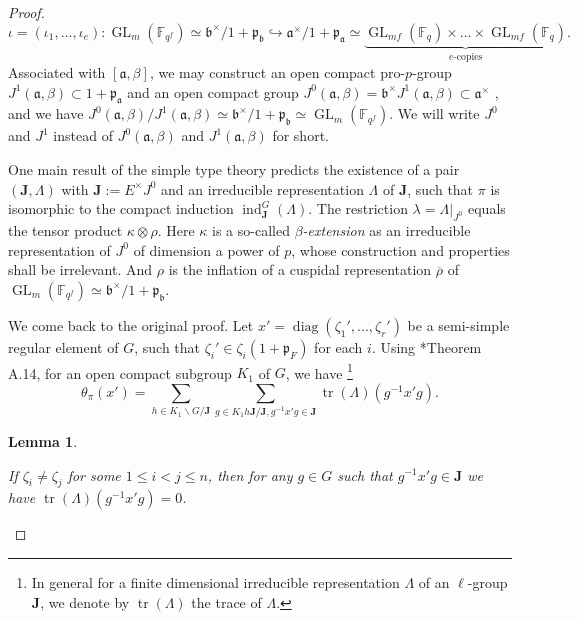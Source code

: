 \documentclass{amsart}
\numberwithin{equation}{section}
\newtheorem{lemma}[theorem]{\bf{Lemma}}
\newcommand{\rest}{\lvert}
\newcommand{\mrgl}{\operatorname{GL}}
\newcommand{\mrtr}{\operatorname{tr}}
\newcommand{\mrdiag}{\operatorname{diag}}
\newcommand{\mrind}{\operatorname{ind}}
\newcommand{\mbf}{\mathbb{F}}
\newcommand{\mfp}{\mathfrak{p}}
\newcommand{\mfa}{\mathfrak{a}}
\newcommand{\mfb}{\mathfrak{b}}
\newcommand{\bs}[1]{\boldsymbol{#1}}
\begin{document}
\begin{proof}
			\begin{equation}\label{eqiotab*a*}
				\iota=(\iota_{1},...,\iota_{e}):\mrgl_{m}(\mbf_{q^{f}})\simeq\mfb^{\times}/1+\mfp_{\mfb}\hookrightarrow\mfa^{\times}/1+\mfp_{\mfa}\simeq\underbrace{\mrgl_{mf}(\mbf_{q})\times...\times\mrgl_{mf}(\mbf_{q})}_{e\text{-copies}}.
			\end{equation}
			Associated with $[\mfa,\beta]$, we may construct an open compact pro-$p$-group $J^{1}(\mfa,\beta)\subset 1+\mfp_{\mfa}$ and an open compact group $J^{0}(\mfa,\beta)=\mfb^{\times} J^{1}(\mfa,\beta)\subset \mfa^{\times}$ , and we have $J^{0}(\mfa,\beta)/J^{1}(\mfa,\beta)\simeq\mfb^{\times}/1+\mfp_{\mfb}\simeq \mrgl_{m}(\mbf_{q^{f}})$. We will write $J^{0}$ and $J^{1}$ instead of $J^{0}(\mfa,\beta)$ and $J^{1}(\mfa,\beta)$ for short. 
			
			One main result of the simple type theory predicts the existence of a pair $(\bs{J},\Lambda)$ with $\bs{J}:=E^{\times}J^{0}$ and an irreducible representation $\Lambda$ of $\bs{J}$, such that $\pi$ is isomorphic to the compact induction $\mrind_{\bs{J}}^{G}(\Lambda)$. The restriction $\lambda=\Lambda\rest_{J^{0}}$ equals the tensor product $\kappa\otimes \rho$. Here $\kappa$ is a so-called \emph{$\beta$-extension} as an irreducible representation of $J^{0}$ of dimension a power of $p$, whose construction and properties shall be irrelevant. And $\rho$ is the inflation of a cuspidal representation $\overline{\rho}$ of $\mrgl_{m}(\mbf_{q^{f}})\simeq\mfb^{\times}/1+\mfp_{\mfb}$. 
			
			We come back to the original proof. Let $x'=\mrdiag(\zeta_{1}',...,\zeta_{r}')$ be a semi-simple regular element of $G$, such that $\zeta_{i}'\in\zeta_{i}(1+\mfp_{F})$ for each $i$. Using \cite{bushnell1996local}*{Theorem A.14}, for an open compact subgroup $K_{1}$ of $G$, we have \footnote{In general for a finite dimensional irreducible representation $\Lambda$ of an $\ell$-group $\bs{J}$, we denote by $\mrtr(\Lambda)$ the trace of $\Lambda$.}
			\begin{equation}\label{eqthetapiTrLambda}
				\theta_{\pi}(x')=\sum_{h\in K_{1}\backslash G/\bs{J}}\sum_{g\in K_{1}h\bs{J}/\bs{J}, g^{-1}x'g\in\bs{J}}\mrtr(\Lambda)(g^{-1}x'g).
			\end{equation}
			
			\begin{lemma}\label{lemmatrLambda=0}
				
				If $\zeta_{i}\neq \zeta_{j}$ for some $1\leq i<j\leq n$, then for any $g\in G$ such that $g^{-1}x'g\in\bs{J}$ we have $\mrtr(\Lambda)(g^{-1}x'g)=0$. 
				

\end{lemma}
\end{proof}
\end{document}

